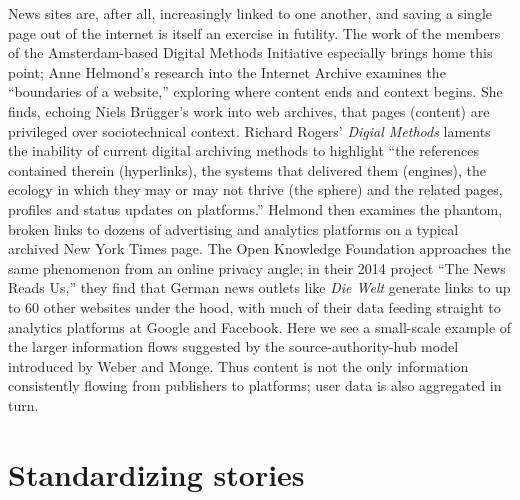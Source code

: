 News sites are, after all, increasingly linked to one another, and saving a single page out of the internet is itself an exercise in futility. The work of the members of the Amsterdam-based Digital Methods Initiative especially brings home this point; Anne Helmond's research into the Internet Archive examines the ``boundaries of a website,'' exploring where content ends and context begins. She finds, echoing Niels Br\"{u}gger's work into web archives, that pages (content) are privileged over sociotechnical context. Richard Rogers' \emph{Digial Methods} laments the inability of current digital archiving methods to highlight ``the references contained therein (hyperlinks), the systems that delivered them (engines), the ecology in which they may or may not thrive (the sphere) and the related pages, profiles and status updates on platforms.''\autocites{helmond_exploring_2013}{rogers_digital_2013} Helmond then examines the phantom, broken links to dozens of advertising and analytics platforms on a typical archived New York Times page. The Open Knowledge Foundation approaches the same phenomenon from an online privacy angle; in their 2014 project ``The News Reads Us,'' they find that German news outlets like \emph{Die Welt} generate links to up to 60 other websites under the hood, with much of their data feeding straight to analytics platforms at Google and Facebook.\autocite{wehrmeyer_news_????} Here we see a small-scale example of the larger information flows suggested by the source-authority-hub model introduced by Weber and Monge.\autocite[See also section 4.1.2.]{weber_flow_2011} Thus content is not the only information consistently flowing from publishers to platforms; user data is also aggregated in turn.

\section{Standardizing stories}

